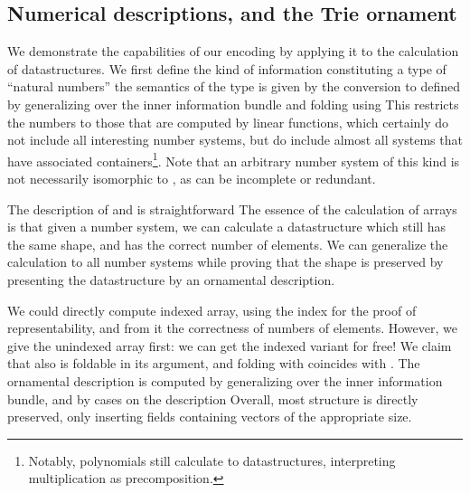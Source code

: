 \subsection{Numerical descriptions, and the Trie ornament}\label{ssec:trieo}
We demonstrate the capabilities of our encoding by applying it to the calculation of datastructures. We first define the kind of information constituting a type of ``natural numbers''
the semantics of the type is given by the conversion to \bN
defined by generalizing over the inner information bundle and folding using
This restricts the numbers to those that are computed by linear functions, which certainly do not include all interesting number systems, but do include almost all systems that have associated containers\footnote{Notably, polynomials still calculate to datastructures, interpreting multiplication as precomposition.}. Note that an arbitrary number system of this kind is not necessarily isomorphic to \bN, as can be incomplete or redundant.

The description of \bN and \bL is straightforward
The essence of the calculation of arrays is that given a number system, we can calculate a datastructure which still has the same shape, and has the correct number of elements. We can generalize the calculation to all number systems while proving that the shape is preserved by presenting the datastructure by an ornamental description.

We could directly compute indexed array, using the index for the proof of representability, and from it the correctness of numbers of elements. However, we give the unindexed array first: we can get the indexed variant for free\cite{algorn}! We claim that 
also is foldable in its argument, and folding with  coincides with . The ornamental description is computed by generalizing over the inner information bundle, and by cases on the description
Overall, most structure is directly preserved, only inserting fields containing vectors of the appropriate size.



